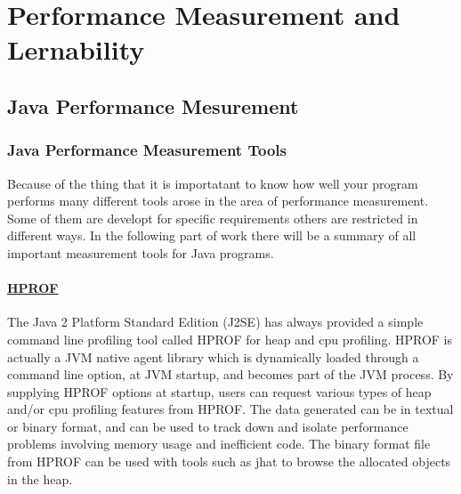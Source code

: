 \chapter{Performance Measurement and Lernability}
\label{chap:p_measurement}



\section{Java Performance Mesurement}


\subsection{Java Performance Measurement Tools}

Because of the thing that it is importatant to know how well your program performs many different tools arose 
in the area of performance measurement. Some of them are developt for specific requirements others are restricted in different ways. In the following part of work there will be a summary of all important measurement tools for Java programs.


\subsubsection{\href{https://profiler.netbeans.org/}{HPROF}}

The Java 2 Platform Standard Edition (J2SE) has always provided a simple command line profiling tool called HPROF for heap and cpu profiling. HPROF is actually a JVM native agent library which is dynamically loaded through a command line option, at JVM startup, and becomes part of the JVM process. By supplying HPROF options at startup, users can request various types of heap and/or cpu profiling features from HPROF. The data generated can be in textual or binary format, and can be used to track down and isolate performance problems involving memory usage and inefficient code. The binary format file from HPROF can be used with tools such as jhat to browse the allocated objects in the heap.

